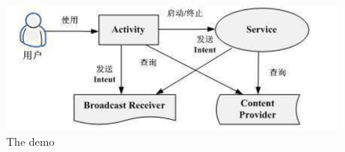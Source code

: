 
\begin{figure}[h!]
\centering
\includegraphics[scale=0.7]{lala}
\caption{The demo}
\label{fig:universe}
\end{figure}
